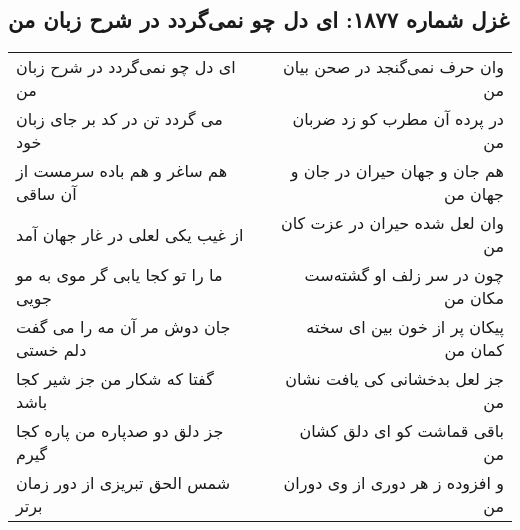 \begin{center}
\section*{غزل شماره ۱۸۷۷: ای دل چو نمی‌گردد در شرح زبان من}
\label{sec:1877}
\begin{longtable}{l p{0.5cm} r}
ای دل چو نمی‌گردد در شرح زبان من
&&
وان حرف نمی‌گنجد در صحن بیان من
\\
می گردد تن در کد بر جای زبان خود
&&
در پرده آن مطرب کو زد ضربان من
\\
هم ساغر و هم باده سرمست از آن ساقی
&&
هم جان و جهان حیران در جان و جهان من
\\
از غیب یکی لعلی در غار جهان آمد
&&
وان لعل شده حیران در عزت کان من
\\
ما را تو کجا یابی گر موی به مو جویی
&&
چون در سر زلف او گشته‌ست مکان من
\\
جان دوش مر آن مه را می گفت دلم خستی
&&
پیکان پر از خون بین ای سخته کمان من
\\
گفتا که شکار من جز شیر کجا باشد
&&
جز لعل بدخشانی کی یافت نشان من
\\
جز دلق دو صدپاره من پاره کجا گیرم
&&
باقی قماشت کو ای دلق کشان من
\\
شمس الحق تبریزی از دور زمان برتر
&&
و افزوده ز هر دوری از وی دوران من
\\
\end{longtable}
\end{center}
